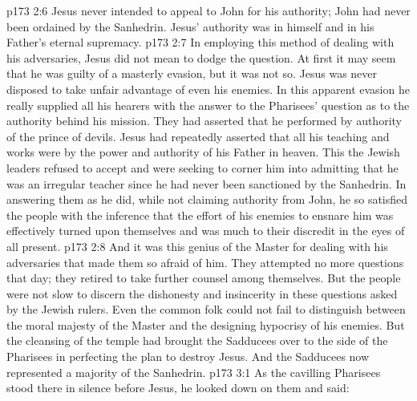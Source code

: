 \vs p173 2:6 \pc Jesus never intended to appeal to John for his authority; John had never been ordained by the Sanhedrin. Jesus’ authority was in himself and in his Father’s eternal supremacy.
\vs p173 2:7 In employing this method of dealing with his adversaries, Jesus did not mean to dodge the question. At first it may seem that he was guilty of a masterly evasion, but it was not so. Jesus was never disposed to take unfair advantage of even his enemies. In this apparent evasion he really supplied all his hearers with the answer to the Pharisees’ question as to the authority behind his mission. They had asserted that he performed by authority of the prince of devils. Jesus had repeatedly asserted that all his teaching and works were by the power and authority of his Father in heaven. This the Jewish leaders refused to accept and were seeking to corner him into admitting that he was an irregular teacher since he had never been sanctioned by the Sanhedrin. In answering them as he did, while not claiming authority from John, he so satisfied the people with the inference that the effort of his enemies to ensnare him was effectively turned upon themselves and was much to their discredit in the eyes of all present.
\vs p173 2:8 And it was this genius of the Master for dealing with his adversaries that made them so afraid of him. They attempted no more questions that day; they retired to take further counsel among themselves. But the people were not slow to discern the dishonesty and insincerity in these questions asked by the Jewish rulers. Even the common folk could not fail to distinguish between the moral majesty of the Master and the designing hypocrisy of his enemies. But the cleansing of the temple had brought the Sadducees over to the side of the Pharisees in perfecting the plan to destroy Jesus. And the Sadducees now represented a majority of the Sanhedrin.
\vs p173 3:1 As the cavilling Pharisees stood there in silence before Jesus, he looked down on them and said: 
